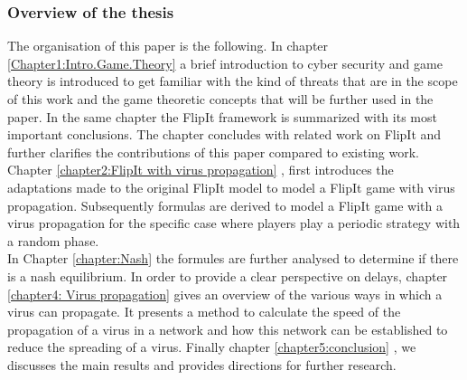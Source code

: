 \subsubsection{Overview of the thesis}

The organisation of this paper is the following.  In chapter \ref{Chapter1:Intro.Game.Theory}  a brief introduction to cyber security and game theory is introduced to get familiar with the kind of threats that are in the scope of this work and the game theoretic concepts that will be further used in the paper. In the same chapter the FlipIt framework is summarized with its most important conclusions. The chapter concludes with related work on FlipIt and further clarifies the contributions of this paper compared to existing work. 
Chapter \ref{chapter2:FlipIt with virus propagation} , first introduces the adaptations made to the original FlipIt model to model a FlipIt game with virus propagation. Subsequently formulas are derived to model a FlipIt game with a virus propagation for the specific case where players play a periodic strategy with a random phase. \\
In Chapter \ref{chapter:Nash} the formules are further analysed to determine if there is a nash equilibrium. 
In order to provide a clear perspective on delays, chapter \ref{chapter4: Virus propagation} gives an overview of the various ways in which a virus can propagate. It presents a method to calculate the speed of the propagation of a virus in a network and how this network can be established to reduce the spreading of a virus.
Finally chapter \ref{chapter5:conclusion} , we discusses the main results and provides directions for further research.

%
% 
%
%
%
% 
%
%
% 



